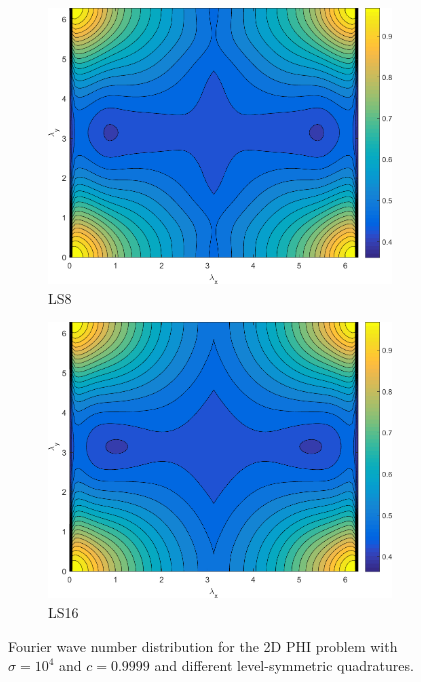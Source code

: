 \begin{figure}
{	}
	\vspace{1.5cm}
	{
	\begin{subfigure}[b]{0.485\textwidth}
		\centering
		\includegraphics[width=\textwidth]{figures/sec_DSA/MODPHI_SI_MIP_C=4_UPWLD1_ncells=2_LS8_sigt=10000_c=9999_contour.png}
		\caption{LS8}
	\end{subfigure}
	\hfill
	\begin{subfigure}[b]{0.485\textwidth}
		\centering
		\includegraphics[width=\textwidth]{figures/sec_DSA/MODPHI_SI_MIP_C=4_UPWLD1_ncells=2_LS16_sigt=10000_c=9999_contour.png}
		\caption{LS16}
	\end{subfigure}
	}
\caption{Fourier wave number distribution for the 2D PHI problem with $\sigma=10^4$ and $c=0.9999$ and different level-symmetric quadratures.}
\label{fig::PHI_sig=10000_c=0.9999}
\end{figure}

